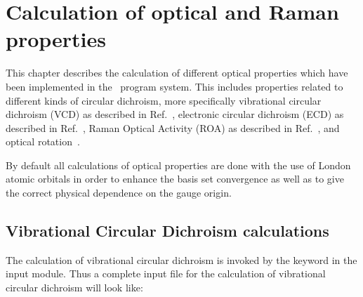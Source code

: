 \chapter{Calculation of optical and Raman properties}\label{ch:optchap}

This chapter describes the calculation of different optical
properties which have been implemented in the \siraba\ program system.
This includes properties related to different kinds of circular
dichroism, more specifically vibrational circular dichroism
(VCD) as 
described in Ref.~\cite{klbpjthkrhjajjcp98}, electronic circular
dichroism (ECD) as
described in Ref.~\cite{klbaehkrthjopjtca90}, Raman 
Optical Activity (ROA) as
described in Ref.~\cite{thkrklbpjjofd99}, and optical rotation~\cite{plpmp91,plpdkckrcpl319}.

By default all calculations of optical properties are done with
the use of London atomic orbitals in order to
enhance the basis set 
convergence as well as to give the correct physical dependence on the
gauge origin. 

\section{Vibrational Circular Dichroism calculations}

\begin{center}
\end{center}

The calculation of vibrational circular
dichroism is invoked
by the 
keyword  in the  input module. Thus a complete
input file for the calculation of vibrational circular dichroism will
look like:

